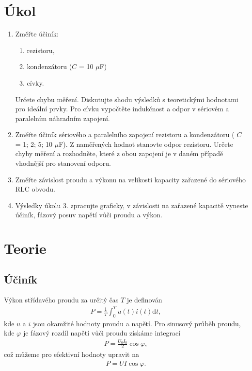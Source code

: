 \documentclass[a4paper,12pt]{article}
\begin{document}
%

\section{Úkol}
\noindent
\begin{enumerate}
    \item Změřte účiník:
        \begin{enumerate}
            \item rezistoru,
            \item kondenzátoru ($C$ = 10 $\mu$F)
            \item cívky. 
        \end{enumerate}
    Určete chybu měření. Diskutujte shodu výsledků s teoretickými hodnotami pro ideální prvky. Pro cívku vypočtěte indukčnost a odpor v sériovém a paralelním náhradním zapojení.
    \item Změřte účiník sériového a paralelního zapojení rezistoru a kondenzátoru ( $C$ = 1; 2; 5; 10 $\mu$F). Z naměřených hodnot stanovte odpor rezistoru. Určete chyby měření a rozhodněte, které z obou zapojení je v daném případě vhodnější pro stanovení odporu.
    \item Změřte závislost proudu a výkonu na velikosti kapacity zařazené do sériového RLC obvodu.
    \item Výsledky úkolu 3. zpracujte graficky, v závislosti na zařazené kapacitě vyneste účiník, fázový posuv napětí vůči proudu a výkon. 
\end{enumerate}

\section{Teorie}

\subsection{Účiník}
Výkon střídavého proudu za určitý čas $T$ je definován
\begin{eqnarray}
P=\frac{1}{T}\int^T_0u(t)i(t)\mbox{d}t,
\end{eqnarray}
kde $u$ a $i$ jsou okamžité hodnoty proudu a napětí. Pro sinusový průběh proudu, kde $\varphi$ je fázový rozdíl napětí vůči proudu získáme integrací
\begin{eqnarray}
P=\frac{U_0I_0}{2}\cos\varphi,
\label{P1}
\end{eqnarray}
což můžeme pro efektivní hodnoty upravit na
\begin{eqnarray}
P=UI\cos\varphi.
\label{P2}
\end{eqnarray}
\end{document}
